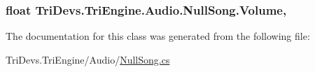 \hypertarget{class_tri_devs_1_1_tri_engine_1_1_audio_1_1_null_song_a3fb3a5ccdbe5dad8adbcd11b77035910}{
\subsubsection[{Volume}]{\setlength{\rightskip}{0pt plus 5cm}float Tri\-Devs.\-Tri\-Engine.\-Audio.\-Null\-Song.\-Volume\hspace{0.3cm}{\ttfamily [get]}, {\ttfamily [set]}}}\label{class_tri_devs_1_1_tri_engine_1_1_audio_1_1_null_song_a3fb3a5ccdbe5dad8adbcd11b77035910}


The documentation for this class was generated from the following file\-:\begin{DoxyCompactItemize}
\item 
Tri\-Devs.\-Tri\-Engine/\-Audio/\hyperlink{_null_song_8cs}{Null\-Song.\-cs}\end{DoxyCompactItemize}
